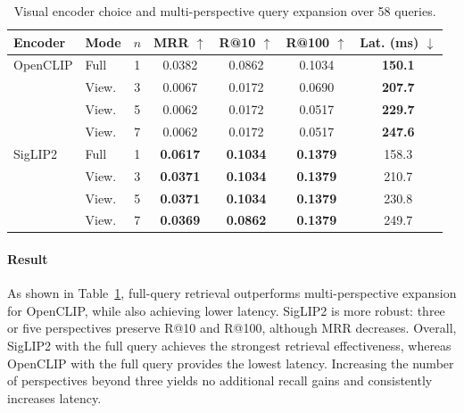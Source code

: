 \documentclass[runningheads]{llncs}
\begin{document}
\begin{table}[t]
    \centering
    \caption{Visual encoder choice and multi-perspective query expansion over 58 queries.}
    \label{tab:query_ablation}
    \small
    \setlength{\tabcolsep}{3.8pt}
    \renewcommand{\arraystretch}{1.08}
    \begin{tabular}{llccccc}
        \toprule
        Encoder & Mode & $n$ &
        MRR $\uparrow$ &
        R@10 $\uparrow$ &
        R@100 $\uparrow$ &
        Lat. (ms) $\downarrow$ \\
        \midrule

        OpenCLIP
        & Full & 1
        & 0.0382
        & 0.0862
        & 0.1034
        & \textbf{150.1} \\

        & View. & 3
        & 0.0067
        & 0.0172
        & 0.0690
        & \textbf{207.7} \\

        & View. & 5
        & 0.0062
        & 0.0172
        & 0.0517
        & \textbf{229.7} \\

        & View. & 7
        & 0.0062
        & 0.0172
        & 0.0517
        & \textbf{247.6} \\

        \midrule

        SigLIP2
        & Full & 1
        & \textbf{0.0617}
        & \textbf{0.1034}
        & \textbf{0.1379}
        & 158.3 \\

        & View. & 3
        & \textbf{0.0371}
        & \textbf{0.1034}
        & \textbf{0.1379}
        & 210.7 \\

        & View. & 5
        & \textbf{0.0371}
        & \textbf{0.1034}
        & \textbf{0.1379}
        & 230.8 \\

        & View. & 7
        & \textbf{0.0369}
        & \textbf{0.0862}
        & \textbf{0.1379}
        & 249.7 \\

        \bottomrule
    \end{tabular}
\end{table}

\paragraph{Result} As shown in Table~\ref{tab:query_ablation}, full-query retrieval
outperforms multi-perspective expansion for OpenCLIP, while also
achieving lower latency. SigLIP2 is more robust: three or five
perspectives preserve R@10 and R@100, although MRR decreases.
Overall, SigLIP2 with the full query achieves the strongest retrieval
effectiveness, whereas OpenCLIP with the full query provides the lowest
latency. Increasing the number of perspectives beyond three yields no
additional recall gains and consistently increases latency.
\end{document}
